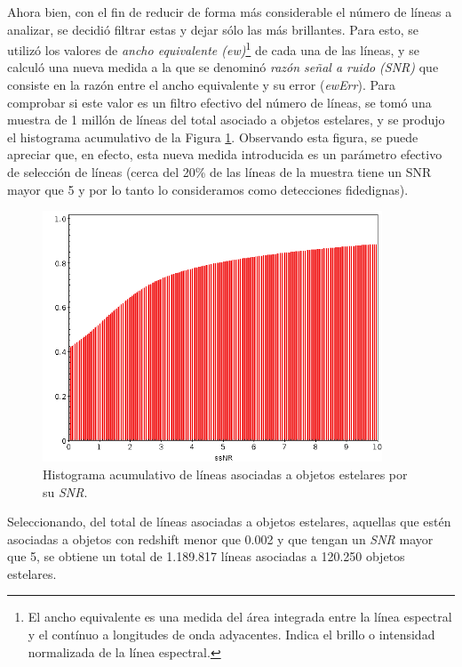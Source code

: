 Ahora bien, con el fin de reducir de forma más considerable el número de líneas a analizar, se decidió filtrar estas y dejar sólo las más brillantes. Para esto, se utilizó los valores de \textit{ancho equivalente (ew)}\footnote{El ancho equivalente es una medida del área integrada entre la línea espectral y el contínuo a longitudes de onda adyacentes. Indica el brillo o intensidad normalizada de la línea espectral.} de cada una de las líneas, y se calculó una nueva medida a la que se denominó \textit{razón señal a ruido (SNR)} que consiste en la razón entre el ancho equivalente y su error (\textit{ewErr}). Para comprobar si este valor es un filtro efectivo del número de líneas, se tomó una muestra de 1 millón de líneas del total asociado a objetos estelares, y se produjo el histograma acumulativo de la Figura \ref{fig:stelar_obj_snr}. Observando esta figura, se puede apreciar que, en efecto, esta nueva medida introducida es un parámetro efectivo de selección de líneas (cerca del 20\% de las líneas de la muestra tiene un SNR mayor que 5 y por lo tanto lo consideramos como detecciones fidedignas).

\begin{figure}[h!]
\begin{center}
\includegraphics[width=0.9\textwidth]{imagenes/stelar_obj_snr_hist.png}
\end{center}
\vspace*{-5mm}
\caption{Histograma acumulativo de líneas asociadas a objetos estelares por su \textit{SNR}.}
\label{fig:stelar_obj_snr}
\end{figure}

Seleccionando, del total de líneas asociadas a objetos estelares, aquellas que estén asociadas a objetos con redshift menor que 0.002 y que tengan un \textit{SNR} mayor que 5, se obtiene un total de 1.189.817 líneas asociadas a 120.250 objetos estelares. 

